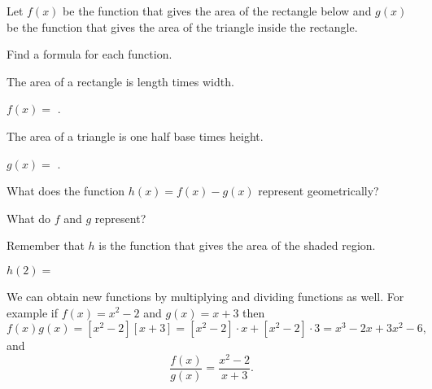 \documentclass{ximera}
\begin{document}
\begin{question}
Let $f(x)$ be the function that gives the area of the rectangle below and $g(x)$ be the function that gives the area of the triangle inside the rectangle. 
\begin{image}
\end{image}

Find a formula for each function.


\begin{hint}
The area of a rectangle is length times width.
\end{hint}
\begin{prompt}
$f(x)=$ .
\end{prompt}

\begin{hint}
The area of a triangle is one half base times height.
\end{hint}
\begin{prompt}
$g(x)=$ .
\end{prompt}

What does the function $h(x)=f(x)-g(x)$ represent geometrically?
\begin{hint}
What do $f$ and $g$ represent? 
\end{hint}
\begin{multipleChoice}
\end{multipleChoice}

\begin{hint}
Remember that $h$ is the function that gives the area of the shaded region. 
\end{hint}
\begin{prompt}
$h(2)=$ 
\end{prompt}
\end{question}

We can obtain new functions by multiplying and dividing functions as well. 
For example if $f(x)=x^2-2$ and $g(x)=x+3$ then 
\[
f(x)g(x)=[x^2-2][x+3]=[x^2-2]\cdot x+[x^2-2]\cdot 3=x^3-2x+3x^2-6,
\]
and
\[
\frac{f(x)}{g(x)}=\frac{x^2-2}{x+3}.
\]
\end{document}
